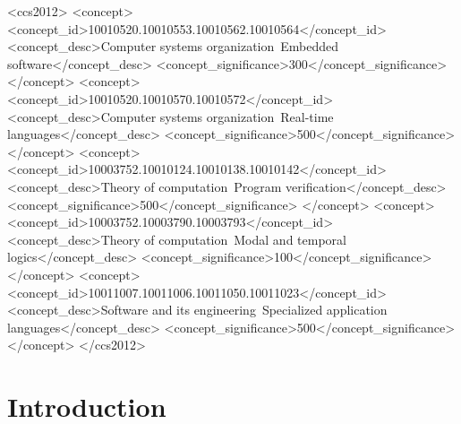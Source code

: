 \documentclass[sigplan,screen]{acmart}
\begin{document}
\begin{CCSXML}
<ccs2012>
    <concept>
        <concept_id>10010520.10010553.10010562.10010564</concept_id>
        <concept_desc>Computer systems organization~Embedded software</concept_desc>
        <concept_significance>300</concept_significance>
        </concept>
    <concept>
        <concept_id>10010520.10010570.10010572</concept_id>
        <concept_desc>Computer systems organization~Real-time languages</concept_desc>
        <concept_significance>500</concept_significance>
        </concept>
    <concept>
        <concept_id>10003752.10010124.10010138.10010142</concept_id>
        <concept_desc>Theory of computation~Program verification</concept_desc>
        <concept_significance>500</concept_significance>
        </concept>
    <concept>
        <concept_id>10003752.10003790.10003793</concept_id>
        <concept_desc>Theory of computation~Modal and temporal logics</concept_desc>
        <concept_significance>100</concept_significance>
        </concept>
    <concept>
        <concept_id>10011007.10011006.10011050.10011023</concept_id>
        <concept_desc>Software and its engineering~Specialized application languages</concept_desc>
        <concept_significance>500</concept_significance>
        </concept>
  </ccs2012>
\end{CCSXML}




\maketitle

\makeatactive

\section{Introduction}
\end{document}
